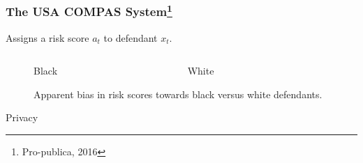 \documentclass{beamer}
\newcommand{\pnote}[1] {}
\begin{document}
\begin{frame}
\begin{columns}
\begin{column}{0.5\textwidth}
    \end{column}
  \end{columns}

  \pnote{Let us begin with a simple example. In the US system of justice, an accused is presented before a judge. The accused has some observable features x, as well as some possibly sensitive features z such as ethnicity or gender.
 Based on what the judge sees, she uses a policy pi to make a decision. Should the defendant be kept in jail until trial? 
Or should they be let go? 
If they are kept in jail, then they almost invariably go to trial.
They may also go to trial if they are freed...
But they may also flee or commit another crime.
Typically, the judge makes the decision by weighing the risk against a utility function that measures the cost of keeping an innocent in prison versus the cost of them committing another crime.}
\end{frame}

\begin{frame}
  \frametitle{The USA COMPAS System\footnote{Pro-publica, 2016}}
  Assigns a \alert{risk score} $a_t$ to defendant $x_t$.
  \begin{figure}[H]
    \begin{columns}
      \begin{column}{0.5\textwidth}
        \centering
        \def\svgwidth{.95\columnwidth}
        
        Black
      \end{column}
      \begin{column}{0.5\textwidth}
        \centering
        \def\svgwidth{0.95\columnwidth}
              
        White
      \end{column}
    \end{columns}
    \label{fig:risk-bias}
    \caption{Apparent bias in risk scores towards black versus white defendants.}
  \end{figure}
\end{frame}


\begin{frame}
  \begin{center}
    {\Huge Privacy}
  \end{center}
\end{frame}
\end{document}

